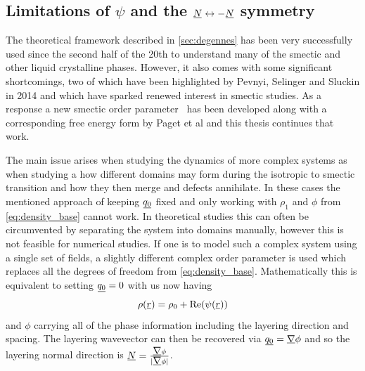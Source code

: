 \documentclass[12pt]{article}
\newcommand{\suf}[2]{\stackunder[0.5pt]{\stackunder[1pt]{\ensuremath{#1}}{\rule{\widthof{\ensuremath{#2}}*\real{0.9}}{.1ex}}}{}}
\newcommand{\duf}[2]{\stackunder[0.5pt]{\stackunder[0.8pt]{\stackunder[1pt]{\ensuremath{#1}}{\rule{\widthof{\ensuremath{#2}}*\real{0.9}}{.1ex}}}{\rule{\widthof{\ensuremath{#2}}*\real{0.9}}{.1ex}}}{}}
\newcommand{\su}[1]{\suf{#1}{#1}}
\newcommand{\du}[1]{\duf{#1}{#1}}
\newcommand{\mgrad}{\suf{\nabla}{K}}
\newcommand{\EE}{\du{E}}
\begin{document}
\subsection{Limitations of $\psi$ and the $\su{N} \leftrightarrow -\su{N}$ symmetry}
The theoretical framework described in \cref{sec:degennes} has been very successfully used since the second half of the 20th to understand many of the smectic and other liquid crystalline phases.
However, it also comes with some significant shortcomings, two of which have been highlighted by Pevnyi, Selinger and Sluckin in 2014\cite{pevnyiModelingSmecticLayers2014} and which have sparked renewed interest in smectic studies.
As a response a new smectic order parameter \EE\ has been developed along with a corresponding free energy form by Paget et al\cite{pagetSmecticLayeringLandau2022,pagetComplextensorTheorySimple2023} and this thesis continues that work.

The main issue arises when studying the dynamics of more complex systems as when studying a how different domains may form during the isotropic to smectic transition and how they then merge and defects annihilate\cite{ambrozicAnnihilationEdgeDislocations2004,abukhdeirDefectKineticsDynamics2008}.
In these cases the mentioned approach of keeping $\su{q_0}$ fixed and only working with $\rho_1$ and $\phi$ from \cref{eq:density_base} cannot work.
In theoretical studies this can often be circumvented by separating the system into domains manually, however this is not feasible for numerical studies.
If one is to model such a complex system using a single set of fields, a slightly different complex order parameter is used which replaces all the degrees of freedom from \cref{eq:density_base}\cite{mukherjeeSimpleLandauModel2001,mukherjeeAdvancesIsotropicSmectic2021}.
Mathematically this is equivalent to setting $\su{q_0} = 0$ with us now having
\begin{equation}\label{eq:density_pevnyi}
    \rho(\su{r}) = \rho_0 + \Re(\psi(\su{r}))
\end{equation}
and $\phi$ carrying all of the phase information including the layering direction and spacing.
The layering wavevector can then be recovered via $\su{q_0} = \mgrad \phi$ and so the layering normal direction is $\su{N} = \frac{\mgrad \phi}{|\mgrad \phi|}$.
\end{document}
